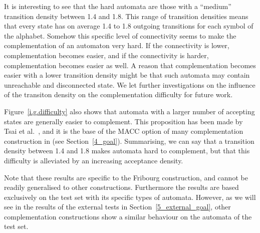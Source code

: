 It is interesting to see that the hard automata are those with a ``medium'' transition density between 1.4 and 1.8. This range of transition densities means that every state has on average 1.4 to 1.8 outgoing transitions for each symbol of the alphabet. Somehow this specific level of connectivity seems to make the complementation of an automaton very hard. If the connectivity is lower, complementation becomes easier, and if the connectivity is harder, complementation becomes easier as well. A reason that complementation becomes easier with a lower transition density might be that such automata may contain unreachable and disconnected state. We let further investigations on the influence of the transiton density on the complementation difficulty for future work.

Figure~\ref{i.g.difficulty} also shows that automata with a larger number of accepting states are generally easier to complement. This proposition has been made by Tsai et al.~\cite{2011_tsai}, and it is the base of the MACC option of many complementation construction in \goal{} (see Section~\ref{4_goal}). Summarising, we can say that a transition density between 1.4 and 1.8 makes automata hard to complement, but that this difficulty is alleviated by an increasing acceptance density.

Note that these results are specific to the Fribourg construction, and cannot be readily generalised to other constructions. Furthermore the results are based exclusively on the \goal{} test set with its specific types of automata. However, as we will see in the results of the external tests in Section~\ref{5_external_goal}, other complementation constructions show a similar behaviour on the automata of the \goal{} test set.



